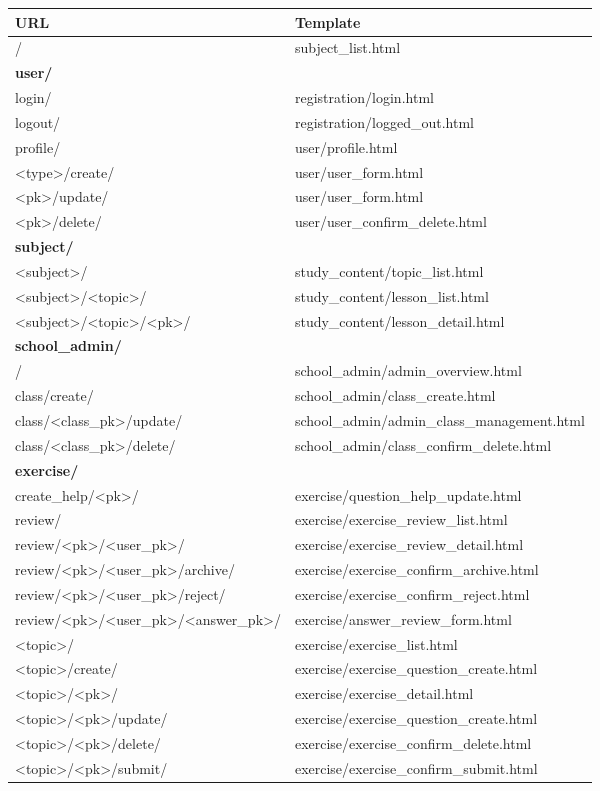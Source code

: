 \begin{table}[H]
	\centering
	\begin{tabu} to 0.9\textwidth {l X}
	\toprule
		\textbf{URL} & \textbf{Template} \\
	\bottomrule
		/ & subject\_list.html \\
	\bottomrule
		\textbf{user/} \\
		login/ & registration/login.html \\
		logout/ & registration/logged\_out.html \\ 
		profile/ & user/profile.html \\
		<type>/create/ & user/user\_form.html \\ 
		<pk>/update/ & user/user\_form.html \\
		<pk>/delete/ & user/user\_confirm\_delete.html \\
	\midrule
		\textbf{subject/} \\
		<subject>/ & study\_content/topic\_list.html \\
		<subject>/<topic>/ & study\_content/lesson\_list.html \\
		<subject>/<topic>/<pk>/ & study\_content/lesson\_detail.html \\
	\midrule
		\textbf{school\_admin/} \\
		/ & school\_admin/admin\_overview.html \\
		class/create/ & school\_admin/class\_create.html \\
		class/<class\_pk>/update/ & school\_admin/admin\_class\_management.html \\
		class/<class\_pk>/delete/ & school\_admin/class\_confirm\_delete.html \\
	\midrule
		\textbf{exercise/} \\
		create\_help/<pk>/ & exercise/question\_help\_update.html \\
		review/ & exercise/exercise\_review\_list.html \\
		review/<pk>/<user\_pk>/ & exercise/exercise\_review\_detail.html \\
		review/<pk>/<user\_pk>/archive/ & exercise/exercise\_confirm\_archive.html \\
		review/<pk>/<user\_pk>/reject/ & exercise/exercise\_confirm\_reject.html \\
		review/<pk>/<user\_pk>/<answer\_pk>/ & exercise/answer\_review\_form.html \\
		
		<topic>/ & exercise/exercise\_list.html \\
		<topic>/create/ & exercise/exercise\_question\_create.html \\
		<topic>/<pk>/ & exercise/exercise\_detail.html \\
		<topic>/<pk>/update/ & exercise/exercise\_question\_create.html \\
		<topic>/<pk>/delete/ & exercise/exercise\_confirm\_delete.html \\
		<topic>/<pk>/submit/ & exercise/exercise\_confirm\_submit.html \\
		

\end{tabu}
\end{table}
